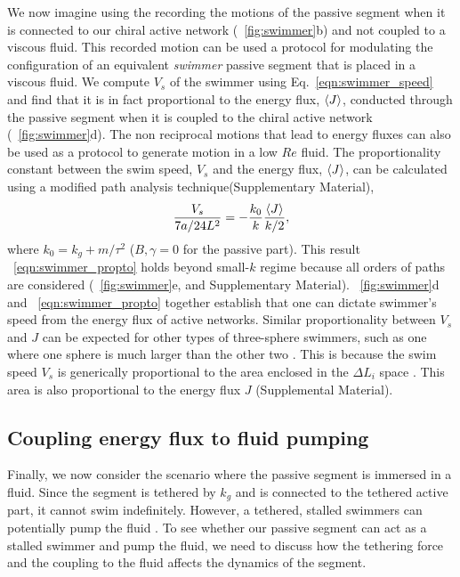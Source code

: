 \documentclass[
 preprint,
 preprintnumbers,
 amsmath,amssymb,
 aps,
 pre,
 longbibliography,
 superscriptaddress,
 10pt, twocolumn
]{revtex4-1}
\begin{document}
We now imagine using the recording the motions of the passive segment when it is connected to our chiral active network (\figurename~\ref{fig:swimmer}b) and not coupled to a viscous fluid. This recorded motion can be used a protocol for modulating the configuration of an equivalent {\it swimmer} passive segment that is placed in a viscous fluid. 
We compute $V_s$ of the swimmer using Eq.~\ref{eqn:swimmer_speed} and find that it is in fact proportional to the energy flux, $\expval{J}$, conducted through the passive segment when it is coupled to the chiral active network (\figurename~\ref{fig:swimmer}d). The non reciprocal motions that lead to energy fluxes can also be used as a protocol to generate motion in a low $Re$ fluid. 
The proportionality constant between the swim speed, $V_s$ and the energy flux, $\expval{J}$, can be calculated using a modified path analysis technique(Supplementary Material),
\begin{equation} \label{eqn:swimmer_propto}
    \frac{V_s}{7a/24L^2} = -\frac{k_0}{k} \frac{\expval{J}}{k/2},
\end{equation}
where $k_0 = k_g + m/\tau^2$ ($B,\gamma=0$ for the passive part).
This result \eqnname~\eqref{eqn:swimmer_propto} holds beyond small-$k$ regime because all orders of paths are considered (\figurename~\ref{fig:swimmer}e, and Supplementary Material).
\figurename~\ref{fig:swimmer}d and \eqnname~\eqref{eqn:swimmer_propto} together establish that one can dictate swimmer's speed from the energy flux of active networks.
Similar proportionality between $V_s$ and $J$ can be expected for other types of three-sphere swimmers, such as one where one sphere is much larger than the other two \cite{Golestanian2008ThreesphereLowReynoldsnumber}. This is because the swim speed $V_s$ is generically proportional to the area enclosed in the $\Delta L_i$ space \cite{Golestanian2009StochasticLow}. This area is also proportional to the energy flux $J$ (Supplemental Material). 

\subsection{Coupling energy flux to fluid pumping}
Finally, we now consider the scenario where the passive segment is immersed in a fluid. Since the segment is tethered by $k_g$ and is connected to the tethered active part, it cannot swim indefinitely. However, a tethered, stalled swimmers can potentially pump the fluid \cite{Leoni2009BasicSwimmer}. To see whether our passive segment can act as a stalled swimmer and pump the fluid, we need to discuss how the tethering force and the coupling to the fluid affects the dynamics of the segment.
\end{document}
